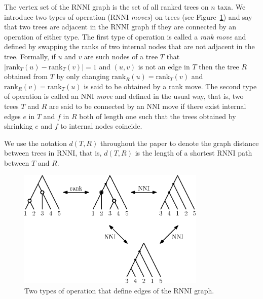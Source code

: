 \documentclass{amsart}
\newcommand{\rank}{\mathrm{rank}}
\newcommand{\nni}{\mathrm{NNI}}
\newcommand{\rnni}{\mathrm{RNNI}}
\begin{document}
The vertex set of the $\rnni$ graph is the set of all ranked trees on $n$ taxa.
We introduce two types of operation ($\rnni$ \emph{moves}) on trees (see Figure~\ref{fig:RNNI}) and say that two trees are adjacent in the $\rnni$ graph if they are connected by an operation of either type.
The first type of operation is called a \emph{rank move} and defined by swapping the ranks of two internal nodes that are not adjacent in the tree.
Formally, if $u$ and $v$ are such nodes of a tree $T$ that $|\rank_T(u) - \rank_T(v)| = 1$ and $(u, v)$ is not an edge in $T$ then the tree $R$ obtained from $T$ by only changing $\rank_R(u) = \rank_T(v)$ and $\rank_R(v) = \rank_T(u)$ is said to be obtained by a rank move.
The second type of operation is called an $\nni$ \emph{move} and defined in the usual way, that is, two trees $T$ and $R$ are said to be connected by an $\nni$ move if there exist internal edges $e$ in $T$ and $f$ in $R$ both of length one such that the trees obtained by shrinking $e$ and $f$ to internal nodes coincide.

We use the notation $d(T, R)$ throughout the paper to denote the graph distance between trees in $\rnni$, that is, $d(T, R)$ is the length of a shortest $\rnni$ path between $T$ and $R$.

\begin{figure}[H]
	\centering
	\includegraphics[width=0.8\textwidth]{RNNI}
    \vspace{2pt}
	\caption{Two types of operation that define edges of the $\rnni$ graph.}
	\label{fig:RNNI}
\end{figure}
\end{document}
